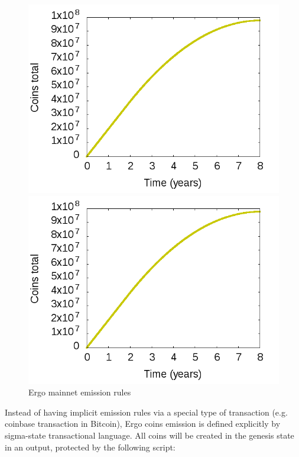 \begin{figure}[H]
    \centering
    \begin{minipage}[b]{0.4\textwidth}

        \includegraphics[width=\textwidth]{img/EmissionCurve.png}
    \end{minipage}
    \begin{minipage}[b]{0.4\textwidth}
        \includegraphics[width=\textwidth]{img/EmissionRate.png}
    \end{minipage}
    \caption{Ergo mainnet emission rules
    \label{fig:emission}}
\end{figure}


Instead of having implicit emission rules via a special type of transaction (e.g. coinbase transaction in Bitcoin),
Ergo coins emission is defined explicitly by sigma-state transactional language.
All \ergo{} coins will be created in the genesis state in an output, protected by the following script:

